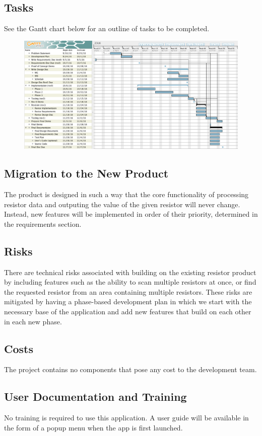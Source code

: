 \documentclass{article}
\begin{document}
\subsection{Tasks}
See the Gantt chart below for an outline of tasks to be completed.
\begin{figure}[h]
\centering
\includegraphics[scale=0.3]{gantt}
\end{figure}

\subsection{Migration to the New Product}
The product is designed in such a way that the core functionality of processing resistor data and outputing the value of the given resistor will never change. Instead, new features will be implemented in order of their priority, determined in the requirements section.

\subsection{Risks}
There are technical risks associated with building on the existing resistor product by including features such as the ability to scan multiple resistors at once, or find the requested resistor from an area containing multiple resistors. These risks are mitigated by having a phase-based development plan in which we start with the necessary base of the application and add new features that build on each other in each new phase.

\subsection{Costs}
The project contains no components that pose any cost to the development team.

\subsection{User Documentation and Training}
No training is required to use this application. A user guide will be available in the form of a popup menu when the app is first launched.
\end{document}
